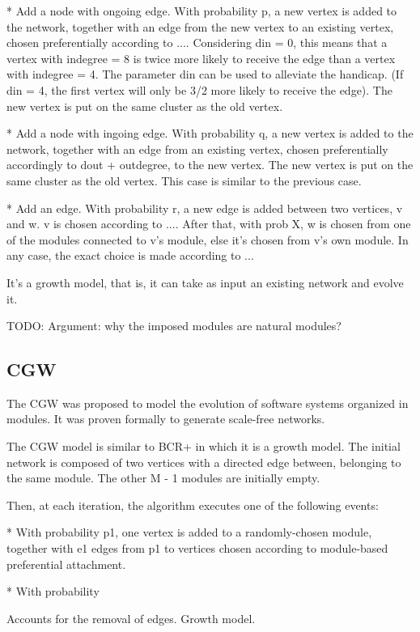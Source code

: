 * Add a node with ongoing edge. With probability p, a new vertex is added to the network, together with an
edge from the new vertex to an existing vertex, chosen preferentially according
to .... Considering din = 0, this means that a vertex with indegree = 8 is
twice more likely to receive the edge than a vertex with indegree = 4. The
parameter din can be used to alleviate the handicap. (If din = 4, the first
vertex will only be 3/2 more likely to receive the edge). The new vertex is
put on the same cluster as the old vertex.

* Add a node with ingoing edge. With probability q, a new vertex is added to the network, together with an
edge from an existing vertex, chosen preferentially accordingly to dout +
outdegree, to the new vertex. The new vertex is put on the same cluster as the
old vertex. This case is similar to the previous case.

* Add an edge. With probability r, a new edge is added between two vertices, v and w. v is
chosen according to .... After that, with prob X, w is chosen from one of the
modules connected to v's module, else it's chosen from v's own module. In any
case, the exact choice is made according to ...

It's a growth model, that is, it can take as input an existing network and
evolve it.

TODO: Argument: why the imposed modules are natural modules?

\subsection{CGW}

The CGW was proposed to model the evolution of software systems organized in
modules. It was proven formally to generate scale-free networks. \cite{Chen2008}

The CGW model is similar to BCR+ in which it is a growth model. The initial
network is composed of two vertices with a directed edge between, belonging
to the same module. The other M - 1 modules are initially empty.

Then, at each iteration, the algorithm executes one of the following events:

* With probability p1, one vertex is added to a randomly-chosen module, together
with e1 edges from p1 to vertices chosen according to module-based preferential
attachment.

* With probability 

Accounts for the removal of edges. Growth model.


